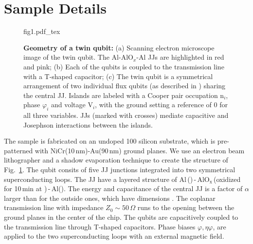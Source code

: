 \section{Sample Details}

\begin{figure}[h]
  \centering\def\svgwidth{8.5cm}{fig1.pdf_tex}
  \caption{\small  \textbf{Geometry  of a  twin  qubit:}  (a) Scanning  electron
    microscope image of the twin qubit. The Al-AlO$_x$-Al JJs are highlighted in
    red and  pink; (b) Each  of the qubits is  coupled to the  transmission line
    with a T-shaped  capacitor; (c) The twin qubit is  a symmetrical arrangement
    of two individual  flux qubits (as described  in \cite{orlando1999}) sharing
    the central  JJ.  Islands are labeled  with a Cooper pair  occupation n$_i$,
    phase $\varphi_i$ and voltage V$_i$, with the  ground setting a reference of 0 for
    all  three variables.   JJs  (marked with  crosses)  mediate capacitive  and
    Josephson  interactions between  the islands.
  }
  \label{fig:setup}
  
\end{figure}


\noindent The sample is fabricated on an undoped 100 silicon substrate, which is
pre-patterned with NiCr(10\,nm)-Au(90\,nm) ground planes. We  use an electron
beam lithographer and a shadow evaporation  technique to create the structure of
Fig.~\ref{fig:setup}. The qubit consits of five JJ junctions integrated into two
symmetrical  superconducting  loops.   The  JJ  have  a   layered  structure  of
Al\,()\,-\,AlO$_{\text{x}}$\,(oxidized     for      10\,min     at
)\,-\,Al().  The energy  and  capacitance of  the
central JJ  is a  factor of  $\alpha$ larger than  for the  outside ones,  which have
dimensions  .    The  coplanar  transmission   line  with
impedance $ Z_{0} \sim 50\,\Omega $ runs to the opening between the ground planes in the
center of the chip. The qubits are capacitively coupled to the transmission line
through T-shaped  capacitors.  Phase  biases $\varphi,  \eta \varphi$, are  applied to  the two
superconducting loops with an external magnetic field.


